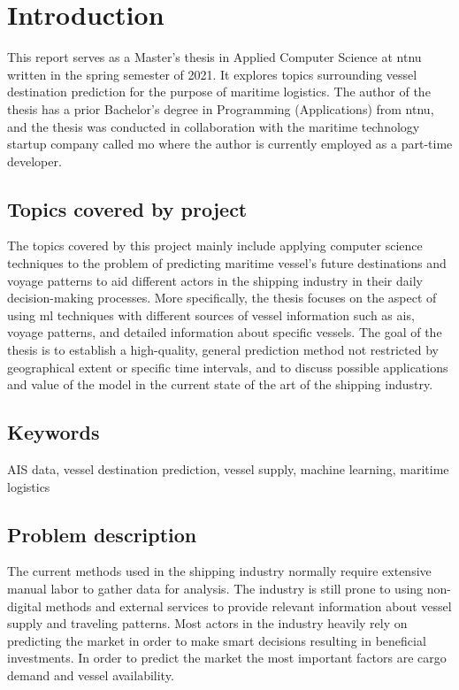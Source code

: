 \chapter{Introduction}


This report serves as a Master's thesis in Applied Computer Science at \acrfull{ntnu} written in the spring semester of 2021. It explores topics surrounding vessel destination prediction for the purpose of maritime logistics. The author of the thesis has a prior Bachelor’s degree in Programming (Applications) from \acrshort{ntnu}, and the thesis was conducted in collaboration with the maritime technology startup company called \acrfull{mo} where the author is currently employed as a part-time developer.


\section{Topics covered by project}
\label{sec:topics_covered}

The topics covered by this project mainly include applying computer science techniques to the problem of predicting maritime vessel's future destinations and voyage patterns to aid different actors in the shipping industry in their daily decision-making processes. More specifically, the thesis focuses on the aspect of using \acrfull{ml} techniques with different sources of vessel information such as \acrfull{ais}, voyage patterns, and detailed information about specific vessels. The goal of the thesis is to establish a high-quality, general prediction method not restricted by geographical extent or specific time intervals, and to discuss possible applications and value of the model in the current state of the art of the shipping industry.

\section{Keywords}

AIS data, vessel destination prediction, vessel supply, machine learning, maritime logistics

\section{Problem description}
\label{sec:problem_desc}

The current methods used in the shipping industry normally require extensive manual labor to gather data for analysis. The industry is still prone to using non-digital methods and external services to provide relevant information about vessel supply and traveling patterns. Most actors in the industry heavily rely on predicting the market in order to make smart decisions resulting in beneficial investments. In order to predict the market the most important factors are cargo demand and vessel availability. %

